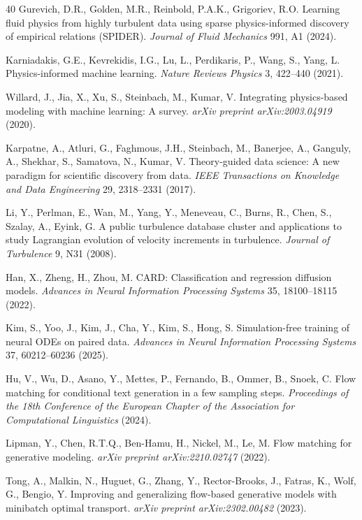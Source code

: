 \documentclass[preprint,12pt]{elsarticle}
\begin{document}
\begin{thebibliography}{40}
Gurevich, D.R., Golden, M.R., Reinbold, P.A.K., Grigoriev, R.O. 
Learning fluid physics from highly turbulent data using sparse physics-informed discovery of empirical relations (SPIDER). 
\textit{Journal of Fluid Mechanics} 991, A1 (2024).

Karniadakis, G.E., Kevrekidis, I.G., Lu, L., Perdikaris, P., Wang, S., Yang, L. 
Physics-informed machine learning. 
\textit{Nature Reviews Physics} 3, 422--440 (2021).

Willard, J., Jia, X., Xu, S., Steinbach, M., Kumar, V. 
Integrating physics-based modeling with machine learning: A survey. 
\textit{arXiv preprint arXiv:2003.04919} (2020).

Karpatne, A., Atluri, G., Faghmous, J.H., Steinbach, M., Banerjee, A., Ganguly, A., Shekhar, S., Samatova, N., Kumar, V. 
Theory-guided data science: A new paradigm for scientific discovery from data. 
\textit{IEEE Transactions on Knowledge and Data Engineering} 29, 2318--2331 (2017).

Li, Y., Perlman, E., Wan, M., Yang, Y., Meneveau, C., Burns, R., Chen, S., Szalay, A., Eyink, G. 
A public turbulence database cluster and applications to study Lagrangian evolution of velocity increments in turbulence. 
\textit{Journal of Turbulence} 9, N31 (2008).

Han, X., Zheng, H., Zhou, M. 
CARD: Classification and regression diffusion models. 
\textit{Advances in Neural Information Processing Systems} 35, 18100--18115 (2022).

Kim, S., Yoo, J., Kim, J., Cha, Y., Kim, S., Hong, S. 
Simulation-free training of neural ODEs on paired data. 
\textit{Advances in Neural Information Processing Systems} 37, 60212--60236 (2025).

Hu, V., Wu, D., Asano, Y., Mettes, P., Fernando, B., Ommer, B., Snoek, C. 
Flow matching for conditional text generation in a few sampling steps. 
\textit{Proceedings of the 18th Conference of the European Chapter of the Association for Computational Linguistics} (2024).

Lipman, Y., Chen, R.T.Q., Ben-Hamu, H., Nickel, M., Le, M. 
Flow matching for generative modeling. 
\textit{arXiv preprint arXiv:2210.02747} (2022).

Tong, A., Malkin, N., Huguet, G., Zhang, Y., Rector-Brooks, J., Fatras, K., Wolf, G., Bengio, Y. 
Improving and generalizing flow-based generative models with minibatch optimal transport. 
\textit{arXiv preprint arXiv:2302.00482} (2023).


\end{thebibliography}
\end{document}
